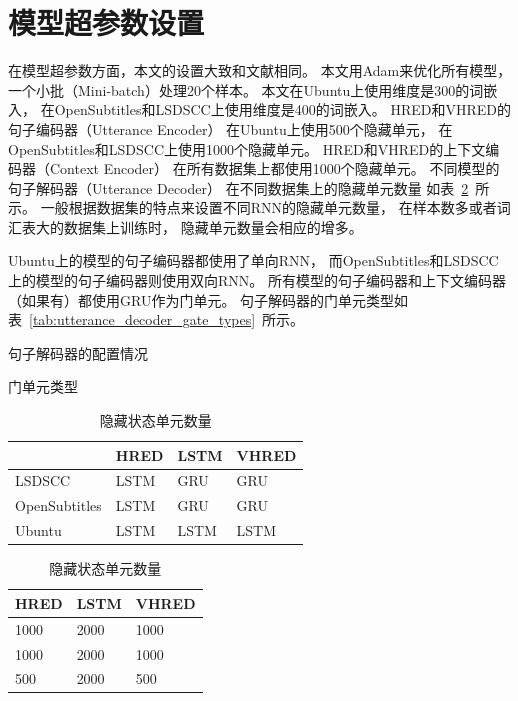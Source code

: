 \section{模型超参数设置}\label{sec:model_hparams}
在模型超参数方面，本文的设置大致和文献\cite{VHRED}相同。
本文用Adam来优化所有模型，
一个小批（Mini-batch）处理20个样本。
本文在Ubuntu上使用维度是300的词嵌入，
在OpenSubtitles和LSDSCC上使用维度是400的词嵌入。
HRED和VHRED的句子编码器（Utterance Encoder）
在Ubuntu上使用500个隐藏单元，
在OpenSubtitles和LSDSCC上使用1000个隐藏单元。
HRED和VHRED的上下文编码器（Context Encoder）
在所有数据集上都使用1000个隐藏单元。
不同模型的句子解码器（Utterance Decoder）
在不同数据集上的隐藏单元数量
如表~\ref{tab:utterance_decoder_hidden_units}~所示。
一般根据数据集的特点来设置不同RNN的隐藏单元数量，
在样本数多或者词汇表大的数据集上训练时，
隐藏单元数量会相应的增多。

Ubuntu上的模型的句子编码器都使用了单向RNN，
而OpenSubtitles和LSDSCC上的模型的句子编码器则使用双向RNN。
所有模型的句子编码器和上下文编码器（如果有）都使用GRU作为门单元。
句子解码器的门单元类型如表~\ref{tab:utterance_decoder_gate_types}~所示。
\begin{table}
    \centering
    \caption{句子解码器的配置情况}
    \setlength{\tabcolsep}{0.11cm}%
    \begin{subtable}{0.5\linewidth}
        \centering
        \caption{门单元类型}
        \label{tab:utterance_decoder_gate_types}
        \begin{tabular}{llll}
            \toprule
            \midrule
            & HRED & LSTM & VHRED \\
            \midrule
            LSDSCC & LSTM & GRU & GRU \\
            OpenSubtitles & LSTM & GRU & GRU \\
            Ubuntu & LSTM & LSTM & LSTM \\
            \bottomrule
        \end{tabular}
    \end{subtable}%
    \begin{subtable}{0.4\linewidth}
        \centering
        \caption{隐藏状态单元数量}
        \label{tab:utterance_decoder_hidden_units}
        \begin{tabular}{lll}
            \toprule
            \midrule
            HRED & LSTM & VHRED \\
            \midrule
            1000 & 2000 & 1000 \\
            1000 & 2000 & 1000 \\
            500 & 2000 & 500 \\
            \bottomrule
        \end{tabular}
    \end{subtable}
\end{table}

